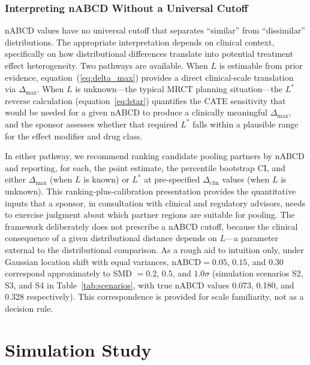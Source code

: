 \documentclass[AMA,Times1COL]{WileyNJDv5}
\begin{document}
\subsubsection{Interpreting nABCD Without a Universal Cutoff}\label{sec:no_cutoff}

nABCD values have no universal cutoff that separates ``similar'' from ``dissimilar'' distributions. The appropriate interpretation depends on clinical context, specifically on how distributional differences translate into potential treatment effect heterogeneity. Two pathways are available. When $L$ is estimable from prior evidence, equation~(\ref{eq:delta_max}) provides a direct clinical-scale translation via $\Delta_{\max}$. When $L$ is unknown---the typical MRCT planning situation---the $L^*$ reverse calculation (equation~\ref{eq:lstar}) quantifies the CATE sensitivity that would be needed for a given nABCD to produce a clinically meaningful $\Delta_{\max}$, and the sponsor assesses whether that required $L^*$ falls within a plausible range for the effect modifier and drug class.

In either pathway, we recommend ranking candidate pooling partners by nABCD and reporting, for each, the point estimate, the percentile bootstrap CI, and either $\Delta_{\max}$ (when $L$ is known) or $L^*$ at pre-specified $\Delta_{\text{clin}}$ values (when $L$ is unknown). This ranking-plus-calibration presentation provides the quantitative inputs that a sponsor, in consultation with clinical and regulatory advisors, needs to exercise judgment about which partner regions are suitable for pooling. The framework deliberately does not prescribe a nABCD cutoff, because the clinical consequence of a given distributional distance depends on $L$---a parameter external to the distributional comparison. As a rough aid to intuition only, under Gaussian location shift with equal variances, $\text{nABCD} = 0.05$, $0.15$, and $0.30$ correspond approximately to SMD $= 0.2$, $0.5$, and $1.0\sigma$ (simulation scenarios S2, S3, and S4 in Table~\ref{tab:scenarios}, with true nABCD values 0.073, 0.180, and 0.328 respectively). This correspondence is provided for scale familiarity, not as a decision rule.

\section{Simulation Study}\label{sec:simulation}
\end{document}
